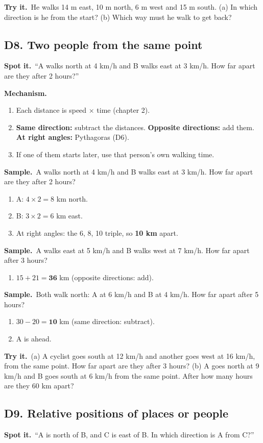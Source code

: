 \documentclass[11pt,a4paper]{article}
\let\oldsubsection\subsection
\renewcommand{\subsection}{\needspace{9\baselineskip}\oldsubsection}
\newcommand{\spot}{\textbf{\color{ember}Spot it.}\ }
\newcommand{\mech}{\textbf{\color{ember}Mechanism.}\ }
\newif\ifkeepsamp
\newcommand{\samp}{\ifkeepsamp\needspace{4\baselineskip}\fi\textbf{\color{ember}Sample.}\ }
\newcommand{\tryit}[1]{\textbf{\color{ember}Try it.}\ #1}
\begin{document}
\tryit He walks 14 m east, 10 m north, 6 m west and 15 m south. (a) In which direction is he from the start? (b) Which way must he walk to get back?

\subsection{D8. Two people from the same point}
\spot ``A walks north at 4 km/h and B walks east at 3 km/h. How far apart are they after 2 hours?''

\mech
\begin{enumerate}
\item Each distance is speed $\times$ time (chapter 2).
\item \textbf{Same direction:} subtract the distances. \textbf{Opposite directions:} add them. \textbf{At right angles:} Pythagoras (D6).
\item If one of them starts later, use that person's own walking time.
\end{enumerate}

\samp A walks north at 4 km/h and B walks east at 3 km/h. How far apart are they after 2 hours?
\begin{enumerate}
\item A: $4 \times 2 = 8$ km north.
\item B: $3 \times 2 = 6$ km east.
\item At right angles: the 6, 8, 10 triple, so \textbf{10 km} apart.
\end{enumerate}
\samp A walks east at 5 km/h and B walks west at 7 km/h. How far apart after 3 hours?
\begin{enumerate}
\item $15 + 21 = \mathbf{36}$ km (opposite directions: add).
\end{enumerate}
\samp Both walk north: A at 6 km/h and B at 4 km/h. How far apart after 5 hours?
\begin{enumerate}
\item $30 - 20 = \mathbf{10}$ km (same direction: subtract).
\item A is ahead.
\end{enumerate}

\tryit (a) A cyclist goes south at 12 km/h and another goes west at 16 km/h, from the same point. How far apart are they after 3 hours? (b) A goes north at 9 km/h and B goes south at 6 km/h from the same point. After how many hours are they 60 km apart?

\subsection{D9. Relative positions of places or people}
\spot ``A is north of B, and C is east of B. In which direction is A from C?''
\end{document}
